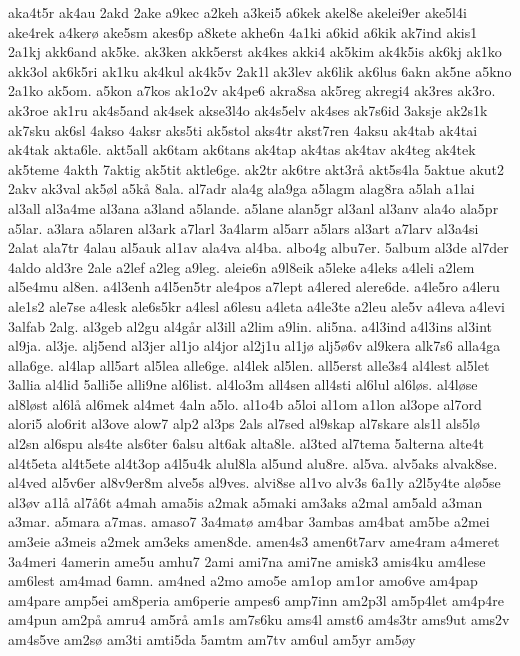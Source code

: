 aka4t5r
ak4au
2akd
2ake
a9kec
a2keh
a3kei5
a6kek
akel8e
akelei9er
ake5l4i
ake4rek
a4ker^^f8
ake5sm
akes6p
a8kete
akhe6n
4a1ki
a6kid
a6kik
ak7ind
akis1
2a1kj
akk6and
ak5ke.
ak3ken
akk5erst
ak4kes
akki4
ak5kim
ak4k5is
ak6kj
ak1ko
akk3ol
ak6k5ri
ak1ku
ak4kul
ak4k5v
2ak1l
ak3lev
ak6lik
ak6lus
6akn
ak5ne
a5kno
2a1ko
ak5om.
a5kon
a7kos
ak1o2v
ak4pe6
akra8sa
ak5reg
akregi4
ak3res
ak3ro.
ak3roe
ak1ru
ak4s5and
ak4sek
akse3l4o
ak4s5elv
ak4ses
ak7s6id
3aksje
ak2s1k
ak7sku
ak6sl
4akso
4aksr
aks5ti
ak5stol
aks4tr
akst7ren
4aksu
ak4tab
ak4tai
ak4tak
akta6le.
akt5all
ak6tam
ak6tans
ak4tap
ak4tas
ak4tav
ak4teg
ak4tek
ak5teme
4akth
7aktig
ak5tit
aktle6ge.
ak2tr
ak6tre
akt3r^^e5
akt5s4la
5aktue
akut2
2akv
ak3val
ak5^^f8l
a5k^^e5
8ala.
al7adr
ala4g
ala9ga
a5lagm
alag8ra
a5lah
a1lai
al3all
al3a4me
al3ana
a3land
a5lande.
a5lane
alan5gr
al3anl
al3anv
ala4o
ala5pr
a5lar.
a3lara
a5laren
al3ark
a7larl
3a4larm
al5arr
a5lars
al3art
a7larv
al3a4si
2alat
ala7tr
4alau
al5auk
al1av
ala4va
al4ba.
albo4g
albu7er.
5album
al3de
al7der
4aldo
ald3re
2ale
a2lef
a2leg
a9leg.
aleie6n
a9l8eik
a5leke
a4leks
a4leli
a2lem
al5e4mu
al8en.
a4l3enh
a4l5en5tr
ale4pos
a7lept
a4lered
alere6de.
a4le5ro
a4leru
ale1s2
ale7se
a4lesk
ale6s5kr
a4lesl
a6lesu
a4leta
a4le3te
a2leu
ale5v
a4leva
a4levi
3alfab
2alg.
al3geb
al2gu
al4g^^e5r
al3ill
a2lim
a9lin.
ali5na.
a4l3ind
a4l3ins
al3int
al9ja.
al3je.
alj5end
al3jer
al1jo
al4jor
al2j1u
al1j^^f8
alj5^^f86v
al9kera
alk7s6
alla4ga
alla6ge.
al4lap
all5art
al5lea
alle6ge.
al4lek
al5len.
all5erst
alle3s4
al4lest
al5let
3allia
al4lid
5alli5e
alli9ne
al6list.
al4lo3m
all4sen
all4sti
al6lul
al6l^^f8s.
al4l^^f8se
al8l^^f8st
al6l^^e5
al6mek
al4met
4aln
a5lo.
al1o4b
a5loi
al1om
a1lon
al3ope
al7ord
alori5
alo6rit
al3ove
alow7
alp2
al3ps
2als
al7sed
al9skap
al7skare
als1l
als5l^^f8
al2sn
al6spu
als4te
als6ter
6alsu
alt6ak
alta8le.
al3ted
al7tema
5alterna
alte4t
al4t5eta
al4t5ete
al4t3op
a4l5u4k
alul8la
al5und
alu8re.
al5va.
alv5aks
alvak8se.
al4ved
al5v6er
al8v9er8m
alve5s
al9ves.
alvi8se
al1vo
alv3s
6a1ly
a2l5y4te
al^^f85se
al3^^f8v
a1l^^e5
al7^^e56t
a4mah
ama5is
a2mak
a5maki
am3aks
a2mal
am5ald
a3man
a3mar.
a5mara
a7mas.
amaso7
3a4mat^^f8
am4bar
3ambas
am4bat
am5be
a2mei
am3eie
a3meis
a2mek
am3eks
amen8de.
amen4s3
amen6t7arv
ame4ram
a4meret
3a4meri
4amerin
ame5u
amhu7
2ami
ami7na
ami7ne
amisk3
amis4ku
am4lese
am6lest
am4mad
6amn.
am4ned
a2mo
amo5e
am1op
am1or
amo6ve
am4pap
am4pare
amp5ei
am8peria
am6perie
ampes6
amp7inn
am2p3l
am5p4let
am4p4re
am4pun
am2p^^e5
amru4
am5r^^e5
am1s
am7s6ku
ams4l
amst6
am4s3tr
ams9ut
ams2v
am4s5ve
am2s^^f8
am3ti
amti5da
5amtm
am7tv
am6ul
am5yr
am5^^f8y

